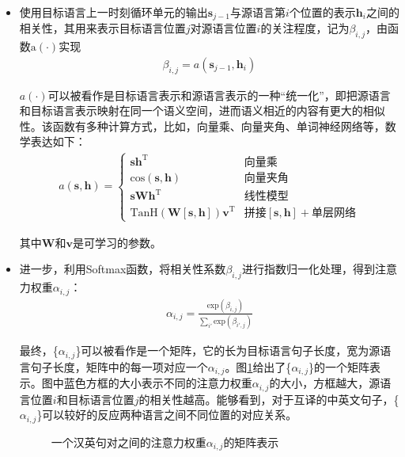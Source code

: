 \begin{itemize}
\vspace{0.5em}
\item	使用目标语言上一时刻循环单元的输出$\mathbf{s}_{j-1}$与源语言第$i$个位置的表示$\mathbf{h}_i$之间的相关性，其用来表示目标语言位置$j$对源语言位置$i$的关注程度，记为$\beta_{i,j}$，由函数$\textrm{a}(\cdot)$实现
\begin{eqnarray}
\beta_{i,j} = a(\mathbf{s}_{j-1},\mathbf{h}_i)
\label{eq:6-23}
\end{eqnarray}

$a(\cdot)$可以被看作是目标语言表示和源语言表示的一种``统一化''，即把源语言和目标语言表示映射在同一个语义空间，进而语义相近的内容有更大的相似性。该函数有多种计算方式，比如，向量乘、向量夹角、单词神经网络等，数学表达如下：
\begin{eqnarray}
a (\mathbf{s},\mathbf{h}) =  \left\{ \begin{array}{ll}
    \mathbf{s} \mathbf{h}^{\textrm{T}} & \textrm{向量乘} \\
    \textrm{cos}(\mathbf{s}, \mathbf{h}) & \textrm{向量夹角} \\
    \mathbf{s} \mathbf{W} \mathbf{h}^{\textrm{T}} & \textrm{线性模型} \\
    \textrm{TanH}(\mathbf{W}[\mathbf{s},\mathbf{h}])\mathbf{v}^{\textrm{T}} & \textrm{拼接}[\mathbf{s},\mathbf{h}]+\textrm{单层网络}
    \end{array}
    \right.
\label{eq:6-24}
\end{eqnarray}

其中$\mathbf{W}$和$\mathbf{v}$是可学习的参数。
\vspace{0.5em}
\item	进一步，利用Softmax函数，将相关性系数$\beta_{i,j}$进行指数归一化处理，得到注意力权重$\alpha_{i,j}$：
\begin{eqnarray}
\alpha_{i,j}=\frac{\textrm{exp}(\beta_{i,j})} {\sum_{i'} \textrm{exp}(\beta_{i',j})}
\label{eq:6-25}
\end{eqnarray}

最终，\{$\alpha_{i,j}$\}可以被看作是一个矩阵，它的长为目标语言句子长度，宽为源语言句子长度，矩阵中的每一项对应一个$\alpha_{i,j}$。图\ref{fig:6-24}给出了\{$\alpha_{i,j}$\}的一个矩阵表示。图中蓝色方框的大小表示不同的注意力权重$\alpha_{i,j}$的大小，方框越大，源语言位置$i$和目标语言位置$j$的相关性越高。能够看到，对于互译的中英文句子，\{$\alpha_{i,j}$\}可以较好的反应两种语言之间不同位置的对应关系。

\begin{figure}[htp]
\centering

\caption{一个汉英句对之间的注意力权重{$\alpha_{i,j}$}的矩阵表示}
\label{fig:6-24}
\end{figure}

\vspace{0.5em}
\end{itemize}

